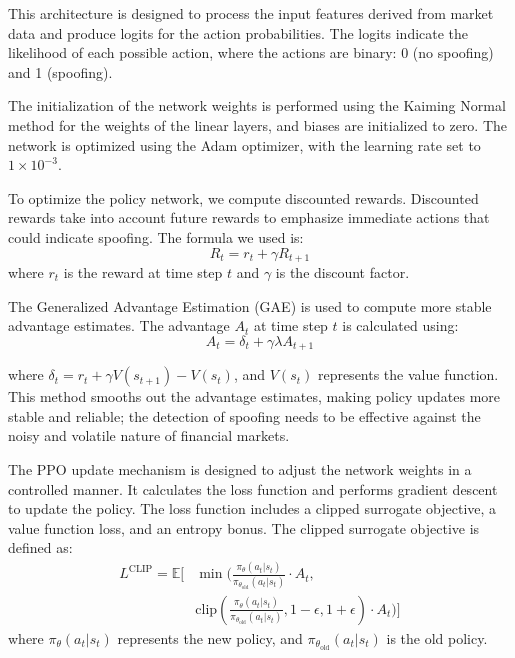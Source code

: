 \documentclass[conference]{IEEEtran}
\begin{document}
\par This architecture is designed to process the input features derived from market data and produce logits for the action probabilities. The logits indicate the likelihood of each possible action, where the actions are binary: 0 (no spoofing) and 1 (spoofing).

\par The initialization of the network weights is performed using the Kaiming Normal method for the weights of the linear layers, and biases are initialized to zero. The network is optimized using the Adam optimizer, with the learning rate set to $1 \times 10^{-3}$.

\par To optimize the policy network, we compute discounted rewards. Discounted rewards take into account future rewards to emphasize immediate actions that could indicate spoofing. The formula we used is:
\begin{equation}
R_t = r_t + \gamma R_{t+1}
\end{equation}
where $r_t$ is the reward at time step $t$ and $\gamma$ is the discount factor.

\par The Generalized Advantage Estimation (GAE) is used to compute more stable advantage estimates. The advantage $A_t$ at time step $t$ is calculated using:
\begin{equation}
A_t = \delta_t + \gamma \lambda A_{t+1}
\end{equation}

where $\delta_t = r_t + \gamma V(s_{t+1}) - V(s_t)$, and $V(s_t)$ represents the value function. This method smooths out the advantage estimates, making policy updates more stable and reliable; the detection of spoofing needs to be effective against the noisy and volatile nature of financial markets.

\par The PPO update mechanism is designed to adjust the network weights in a controlled manner. It calculates the loss function and performs gradient descent to update the policy. The loss function includes a clipped surrogate objective, a value function loss, and an entropy bonus. The clipped surrogate objective is defined as:
\begin{equation}
\begin{split}
L^{\text{CLIP}} = \mathbb{E} \Bigg[ &\min \Bigg( \frac{\pi_\theta(a_t|s_t)}{\pi_{\theta_{\text{old}}}(a_t|s_t)} \cdot A_t, \\
& \text{clip}\left(\frac{\pi_\theta(a_t|s_t)}{\pi_{\theta_{\text{old}}}(a_t|s_t)}, 1 - \epsilon, 1 + \epsilon \right) \cdot A_t \Bigg) \Bigg]
\end{split}
\end{equation}
where $\pi_\theta(a_t|s_t)$ represents the new policy, and $\pi_{\theta_{\text{old}}}(a_t|s_t)$ is the old policy.
\end{document}

